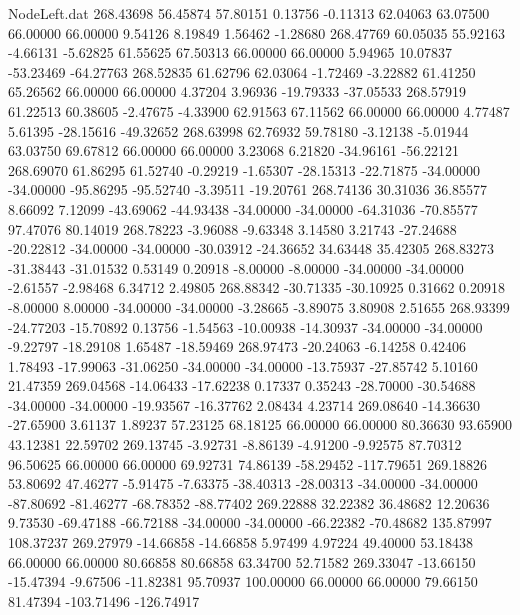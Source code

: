 \begin{filecontents}{NodeLeft.dat}
 268.43698   56.45874   57.80151     0.13756   -0.11313   62.04063   63.07500   66.00000   66.00000    9.54126    8.19849    1.56462   -1.28680
 268.47769   60.05035   55.92163    -4.66131   -5.62825   61.55625   67.50313   66.00000   66.00000    5.94965   10.07837  -53.23469  -64.27763
 268.52835   61.62796   62.03064    -1.72469   -3.22882   61.41250   65.26562   66.00000   66.00000    4.37204    3.96936  -19.79333  -37.05533
 268.57919   61.22513   60.38605    -2.47675   -4.33900   62.91563   67.11562   66.00000   66.00000    4.77487    5.61395  -28.15616  -49.32652
 268.63998   62.76932   59.78180    -3.12138   -5.01944   63.03750   69.67812   66.00000   66.00000    3.23068    6.21820  -34.96161  -56.22121
 268.69070   61.86295   61.52740    -0.29219   -1.65307  -28.15313  -22.71875  -34.00000  -34.00000  -95.86295  -95.52740   -3.39511  -19.20761
 268.74136   30.31036   36.85577     8.66092    7.12099  -43.69062  -44.93438  -34.00000  -34.00000  -64.31036  -70.85577   97.47076   80.14019
 268.78223   -3.96088   -9.63348     3.14580    3.21743  -27.24688  -20.22812  -34.00000  -34.00000  -30.03912  -24.36652   34.63448   35.42305
 268.83273  -31.38443  -31.01532     0.53149    0.20918   -8.00000   -8.00000  -34.00000  -34.00000   -2.61557   -2.98468    6.34712    2.49805
 268.88342  -30.71335  -30.10925     0.31662    0.20918   -8.00000    8.00000  -34.00000  -34.00000   -3.28665   -3.89075    3.80908    2.51655
 268.93399  -24.77203  -15.70892     0.13756   -1.54563  -10.00938  -14.30937  -34.00000  -34.00000   -9.22797  -18.29108    1.65487  -18.59469
 268.97473  -20.24063   -6.14258     0.42406    1.78493  -17.99063  -31.06250  -34.00000  -34.00000  -13.75937  -27.85742    5.10160   21.47359
 269.04568  -14.06433  -17.62238     0.17337    0.35243  -28.70000  -30.54688  -34.00000  -34.00000  -19.93567  -16.37762    2.08434    4.23714
 269.08640  -14.36630  -27.65900     3.61137    1.89237   57.23125   68.18125   66.00000   66.00000   80.36630   93.65900   43.12381   22.59702
 269.13745   -3.92731   -8.86139    -4.91200   -9.92575   87.70312   96.50625   66.00000   66.00000   69.92731   74.86139  -58.29452 -117.79651
 269.18826   53.80692   47.46277    -5.91475   -7.63375  -38.40313  -28.00313  -34.00000  -34.00000  -87.80692  -81.46277  -68.78352  -88.77402
 269.22888   32.22382   36.48682    12.20636    9.73530  -69.47188  -66.72188  -34.00000  -34.00000  -66.22382  -70.48682  135.87997  108.37237
 269.27979  -14.66858  -14.66858     5.97499    4.97224   49.40000   53.18438   66.00000   66.00000   80.66858   80.66858   63.34700   52.71582
 269.33047  -13.66150  -15.47394    -9.67506  -11.82381   95.70937  100.00000   66.00000   66.00000   79.66150   81.47394 -103.71496 -126.74917

\end{filecontents}
